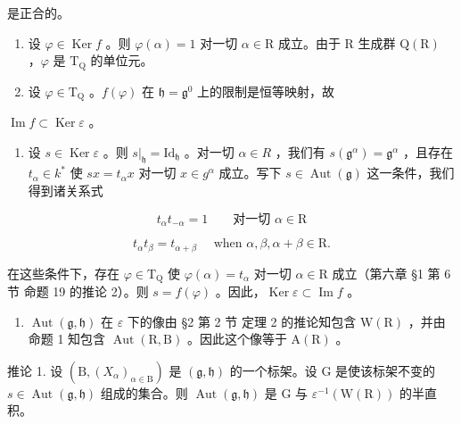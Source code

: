 是正合的。

\begin{enumerate}
\def\labelenumi{\alph{enumi})}
\item
  设 \(\varphi \in \operatorname{Ker} f\) 。则 \(\varphi(\alpha) = 1\) 对一切 \(\alpha \in \mathrm{R}\) 成立。由于 \(\mathrm{R}\) 生成群 \(\mathrm{Q}(\mathrm{R})\) ，\(\varphi\) 是 \(\mathrm{T}_{\mathrm{Q}}\) 的单位元。
\item
  设 \(\varphi \in \mathrm{T}_{\mathrm{Q}}\) 。\(f(\varphi)\) 在 \(\mathfrak{h} = \mathfrak{g}^0\) 上的限制是恒等映射，故
\end{enumerate}

\(\operatorname{Im} f \subset \operatorname{Ker} \varepsilon\) 。

\begin{enumerate}
\def\labelenumi{\alph{enumi})}
\setcounter{enumi}{2}
\tightlist
\item
  设 \(s \in \operatorname{Ker} \varepsilon\) 。则 \(s|_{\mathfrak{h}} = \mathrm{Id}_{\mathfrak{h}}\) 。对一切 \(\alpha \in R\) ，我们有 \(s(\mathfrak{g}^{\alpha}) = \mathfrak{g}^{\alpha}\) ，且存在 \(t_{\alpha} \in k^{*}\) 使 \(sx = t_{\alpha}x\) 对一切 \(x \in g^{\alpha}\) 成立。写下 \(s \in \operatorname{Aut}(\mathfrak{g})\) 这一条件，我们得到诸关系式
\end{enumerate}

\[
t _ {\alpha} t _ {- \alpha} = 1 \qquad \text{对一切 } \alpha \in \mathrm{R}
\]

\[
t _ {\alpha} t _ {\beta} = t _ {\alpha + \beta} \quad \text { when } \alpha , \beta , \alpha + \beta \in \mathrm{R}.
\]

在这些条件下，存在 \(\varphi \in \mathrm{T}_{\mathrm{Q}}\) 使 \(\varphi (\alpha) = t_{\alpha}\) 对一切 \(\alpha \in \mathrm{R}\) 成立（第六章 §1 第 6 节 命题 19 的推论 2）。则 \(s = f(\varphi)\) 。因此，\(\operatorname{Ker} \varepsilon \subset \operatorname{Im} f\) 。

\begin{enumerate}
\def\labelenumi{\alph{enumi})}
\setcounter{enumi}{3}
\tightlist
\item
  \(\operatorname{Aut}(\mathfrak{g},\mathfrak{h})\) 在 \(\varepsilon\) 下的像由 §2 第 2 节 定理 2 的推论知包含 \(\mathrm{W}(\mathrm{R})\) ，并由命题 1 知包含 \(\operatorname{Aut}(\mathrm{R},\mathrm{B})\) 。因此这个像等于 \(\mathrm{A}(\mathrm{R})\) 。
\end{enumerate}

推论 1. 设 \((\mathrm{B}, (X_{\alpha})_{\alpha \in \mathrm{B}})\) 是 \((\mathfrak{g}, \mathfrak{h})\) 的一个标架。设 \(\mathrm{G}\) 是使该标架不变的 \(s \in \operatorname{Aut}(\mathfrak{g}, \mathfrak{h})\) 组成的集合。则 \(\operatorname{Aut}(\mathfrak{g}, \mathfrak{h})\) 是 \(\mathrm{G}\) 与 \(\varepsilon^{-1}(\mathrm{W}(\mathrm{R}))\) 的半直积。

